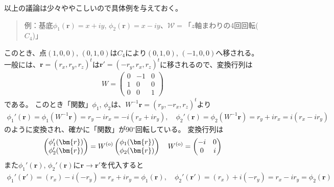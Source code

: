 \documentclass[11pt]{easymemo}
\begin{document}
以上の議論は少々ややこしいので具体例を与えておく。
\begin{quote}
  例：基底$\phi_{1}(\bm{r})=x+iy$, $\phi_{2}(\bm{r})=x-iy$、$\mathcal{W}=$「$z$軸まわりの4回回転($C_{4}$)」
\end{quote}
このとき、点$(1,0,0)$, $(0,1,0)$は$C_{4}$により$(0,1,0)$, $(-1,0,0)$へ移される。
一般には、$\bm{r}=(r_{x},r_{y},r_{z})^{t}$は$\bm{r}'=(-r_{y},r_{x},r_{z})^{t}$に移されるので、変換行列は
\begin{align*}
  W=\begin{pmatrix} 0 & -1 & 0 \\ 1 & 0 & 0 \\ 0 & 0 & 1 \end{pmatrix}
\end{align*}
である。
このとき「関数」$\phi_{1}$, $\phi_{2}$は、$W^{-1}\bm{r}=(r_{y},-r_{x},r_{z})^{t}$より
\begin{align*}
  \phi_{1}'(\bm{r})=\phi_{1}(W^{-1}\bm{r})=r_{y}-ir_{x}=-i(r_{x}+ir_{y}),
  \quad
  \phi_{2}'(\bm{r})=\phi_{2}(W^{-1}\bm{r})=r_{y}+ir_{x}=i(r_{x}-ir_{y})
\end{align*}
のように変換され、確かに「関数」が90$^{\circ}$回転している。
変換行列は
\begin{align*}
  \begin{pmatrix}\phi_{1}'(\bm{r}) \\ \phi_{2}'(\bm{r}) \end{pmatrix}
  =
  W^{\rm (o)}
  \begin{pmatrix}\phi_{1}(\bm{r}) \\ \phi_{2}(\bm{r}) \end{pmatrix}
  \quad
  W^{\rm (o)}=\begin{pmatrix}-i & 0\\ 0 & i\end{pmatrix}
\end{align*}
また$\phi_{1}'(\bm{r})$, $\phi_{2}'(\bm{r})$に$\bm{r}\to\bm{r}'$を代入すると
\begin{align*}
  \phi_{1}'(\bm{r}')=(r_{x})-i(-r_{y})=r_{x}+ir_{y}=\phi_{1}(\bm{r}),
  \quad
  \phi_{2}'(\bm{r}')=(r_{x})+i(-r_{y})=r_{x}-ir_{y}=\phi_{2}(\bm{r})
\end{align*}
\end{document}
